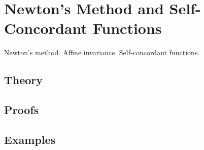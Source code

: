 
\section{Newton's Method and Self-Concordant Functions}
\label{sec:2.4.15-newton-method}

\begin{ticket}
Newton's method. Affine invariance. Self-concordant functions.
\end{ticket}

\subsection*{Theory}

\subsection*{Proofs}

\subsection*{Examples}
